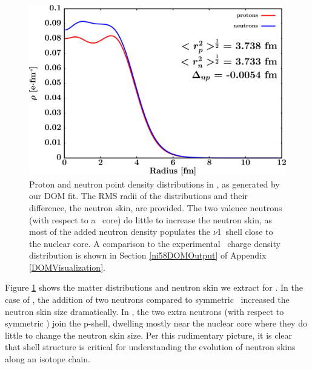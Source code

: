 \begin{figure}[tb]
    \centering
    \includegraphics[width=\textwidth]{figures/ni58_matterDensity.png}
    \caption[Proton and neutron matter density distributions in \niEight]
    {
        Proton and neutron point density distributions in \niEight, as
        generated by our DOM fit. The RMS radii of the distributions and their
        difference, the neutron skin, are provided. The two valence neutrons (with respect to
        a \niSix\ core) do little to increase the neutron skin, as most of the added
        neutron density populates the $\nu$1\pThree\ shell close to the nuclear core.
        A comparison to the
        experimental \niEight\ charge density distribution is shown in Section
        \ref{ni58DOMOutput} of Appendix \ref{DOMVisualization}.
    }
    \label{ni58MatterDistribution}
\end{figure}

Figure \ref{ni58MatterDistribution} shows the matter distributions and neutron skin we extract for 
\niEight. In the case of \oEight, the addition of two neutrons compared to symmetric \oSix\
increased the neutron skin size dramatically. In \niEight, the two extra neutrons (with respect to
symmetric \niSix) join the p-shell, dwelling mostly near the nuclear core where they do little
to change the neutron skin size. Per this rudimentary picture, it is clear that
shell structure is critical for understanding the evolution of neutron skins along an isotope chain. 

